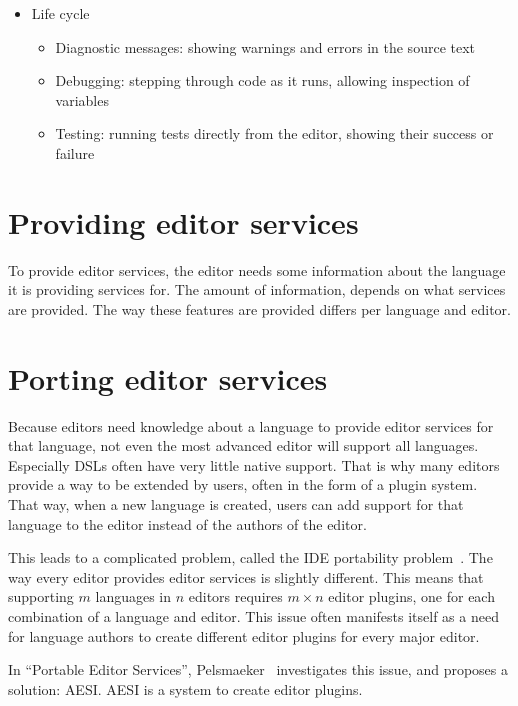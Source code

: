\begin{itemize}
    \item Life cycle
    \begin{itemize}
        \item Diagnostic messages: showing warnings and errors in the source text
        \item Debugging: stepping through code as it runs, allowing inspection of variables
        \item Testing: running tests directly from the editor, showing their success or failure
    \end{itemize}
\end{itemize}

\section{Providing editor services}\label{sec:providing-editor-services}

To provide editor services, the editor needs some information about the language it is providing services for.
The amount of information, depends on what services are provided.
The way these features are provided differs per language and editor.



\section{Porting editor services}\label{sec:porting-editor-services}

Because editors need knowledge about a language to provide editor services for that language, not even the most advanced editor will support all languages.
Especially \acp{DSL} often have very little native support.
That is why many editors provide a way to be extended by users, often in the form of a plugin system.
That way, when a new language is created, users can add support for that language to the editor instead of the authors of the editor.

This leads to a complicated problem, called the \ac{IDE} portability problem~\autocite{KeidelPE16}.
The way every editor provides editor services is slightly different.
This means that supporting $m$ languages in $n$ editors requires $m \times n$ editor plugins, one for each
combination of a language and editor.
This issue often manifests itself as a need for language authors to create different editor plugins for every major editor.

In ``Portable Editor Services'', Pelsmaeker~\autocite*{Pelsmaeker2018} investigates this issue, and proposes a solution: \ac{AESI}.
\ac{AESI} is a system to create editor plugins.


